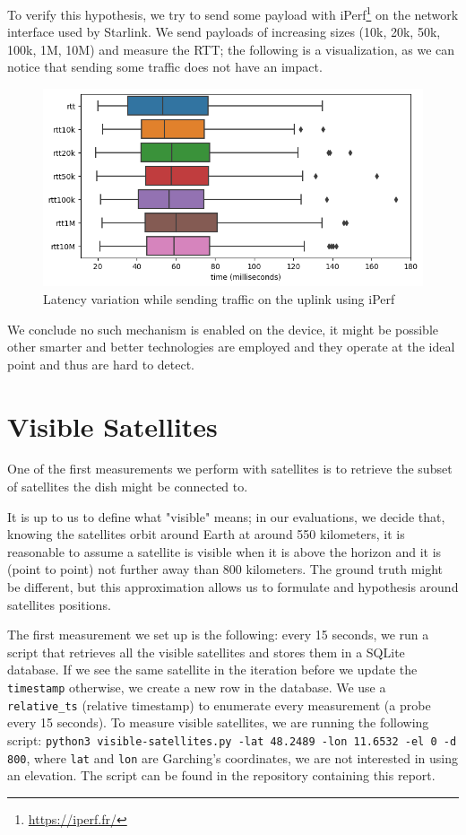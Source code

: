 \documentclass[IN,11pt,twoside,openright,idp,english]{tumthesis}
\begin{document}
To verify this hypothesis, we try to send some payload with iPerf\footnote{\url{https://iperf.fr/}} on the network
interface used by Starlink. We send payloads of increasing sizes (10k, 20k, 50k, 100k, 1M, 10M) and measure the RTT; the
following is a visualization, as we can notice that sending some traffic does not have an impact.

\begin{figure}
    \centering
    \includegraphics[width=0.6\columnwidth]{img/latency_iperf.png}
    \caption{Latency variation while sending traffic on the uplink using iPerf}
\end{figure}

We conclude no such mechanism is enabled on the device, it might be possible other smarter and better technologies are
employed and they operate at the ideal point and thus are hard to detect.

\section{Visible Satellites}

One of the first measurements we perform with satellites is to retrieve the subset of satellites the dish might be
connected to.

It is up to us to define what "visible" means; in our evaluations, we decide that, knowing the satellites orbit around
Earth at around 550 kilometers, it is reasonable to assume a satellite is visible when it is above the horizon and it is
(point to point) not further away than 800 kilometers. The ground truth might be different, but this approximation
allows us to formulate and hypothesis around satellites positions. 

The first measurement we set up is the following: every 15 seconds, we run a script that retrieves all the visible
satellites and stores them in a SQLite database. If we see the same satellite in the iteration before we update the
\texttt{timestamp} otherwise, we create a new row in the database. We use a \texttt{relative\_ts} (relative timestamp)
to enumerate every measurement (a probe every 15 seconds). To measure visible satellites, we are running the following
script: \texttt{python3 visible-satellites.py -lat 48.2489 -lon 11.6532 -el 0 -d 800}, where \texttt{lat} and
\texttt{lon} are Garching's coordinates, we are not interested in using an elevation. The script can be found in the
repository containing this report.
\end{document}

